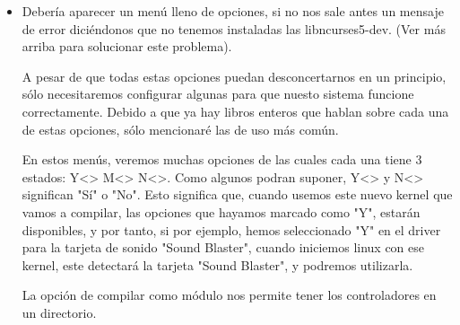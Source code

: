 \begin{itemize}
\item Debería  aparecer un  menú lleno  de opciones,  si no  nos sale
antes un mensaje  de error diciéndonos que no  tenemos instaladas las
libncurses5-dev. (Ver más arriba para solucionar este problema). 

A  pesar de  que todas  estas opciones  puedan desconcertarnos  en un 
principio,  sólo necesitaremos  configurar  algunas  para que  nuesto 
sistema funcione  correctamente. Debido a  que ya hay  libros enteros 
que hablan sobre  cada una de estas opciones, sólo  mencionaré las de 
uso más común.

En estos menús, veremos muchas opciones  de las cuales cada una tiene 
3  estados: Y<>  M<>  N<>. Como  algunos podran  suponer,  Y<> y  N<> 
significan "Sí" o "No". Esto  significa que, cuando usemos este nuevo 
kernel que  vamos a compilar,  las opciones que hayamos  marcado como 
"Y",  estarán  disponibles,  y  por  tanto,  si  por  ejemplo,  hemos 
seleccionado  "Y" en  el  driver  para la  tarjeta  de sonido  "Sound 
Blaster", cuando  iniciemos linux con  ese kernel, este  detectará la 
tarjeta "Sound Blaster", y podremos utilizarla.                       

La opción de compilar como módulo nos permite tener los controladores
en un directorio.

\end{itemize}
